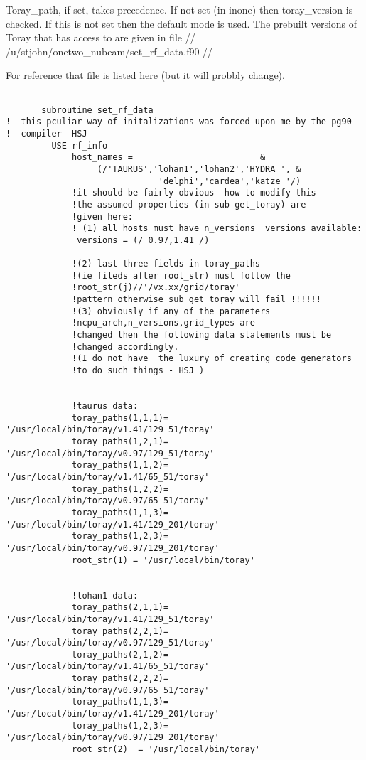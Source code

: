 \documentclass[12pt]{article}
\begin{document}
         Toray\_path, if set, takes precedence. If not set (in inone)
         then toray\_version is checked. If this is not set then
         the default mode is used.
         The prebuilt versions of Toray that \ot has access to are
         given in file //
         /u/stjohn/onetwo\_nubeam/set\_rf\_data.f90  //

         For reference that file is listed here (but it will probbly change).
         \begin{verbatim}

       subroutine set_rf_data
!  this pculiar way of initalizations was forced upon me by the pg90
!  compiler -HSJ
         USE rf_info
             host_names =                         &
                  (/'TAURUS','lohan1','lohan2','HYDRA ', &
                              'delphi','cardea','katze '/)
             !it should be fairly obvious  how to modify this
             !the assumed properties (in sub get_toray) are
             !given here:
             ! (1) all hosts must have n_versions  versions available:
              versions = (/ 0.97,1.41 /) 

             !(2) last three fields in toray_paths 
             !(ie fileds after root_str) must follow the
             !root_str(j)//'/vx.xx/grid/toray' 
             !pattern otherwise sub get_toray will fail !!!!!!
             !(3) obviously if any of the parameters 
             !ncpu_arch,n_versions,grid_types are 
             !changed then the following data statements must be
             !changed accordingly. 
             !(I do not have  the luxury of creating code generators
             !to do such things - HSJ )


             !taurus data:
             toray_paths(1,1,1)= '/usr/local/bin/toray/v1.41/129_51/toray'
             toray_paths(1,2,1)= '/usr/local/bin/toray/v0.97/129_51/toray' 
             toray_paths(1,1,2)= '/usr/local/bin/toray/v1.41/65_51/toray'
             toray_paths(1,2,2)= '/usr/local/bin/toray/v0.97/65_51/toray'  
             toray_paths(1,1,3)= '/usr/local/bin/toray/v1.41/129_201/toray'
             toray_paths(1,2,3)= '/usr/local/bin/toray/v0.97/129_201/toray'  
             root_str(1) = '/usr/local/bin/toray' 


             !lohan1 data:
             toray_paths(2,1,1)= '/usr/local/bin/toray/v1.41/129_51/toray'
             toray_paths(2,2,1)= '/usr/local/bin/toray/v0.97/129_51/toray' 
             toray_paths(2,1,2)= '/usr/local/bin/toray/v1.41/65_51/toray'
             toray_paths(2,2,2)= '/usr/local/bin/toray/v0.97/65_51/toray' 
             toray_paths(1,1,3)= '/usr/local/bin/toray/v1.41/129_201/toray'
             toray_paths(1,2,3)= '/usr/local/bin/toray/v0.97/129_201/toray' 
             root_str(2)  = '/usr/local/bin/toray' 



\end{verbatim}
\end{document}
